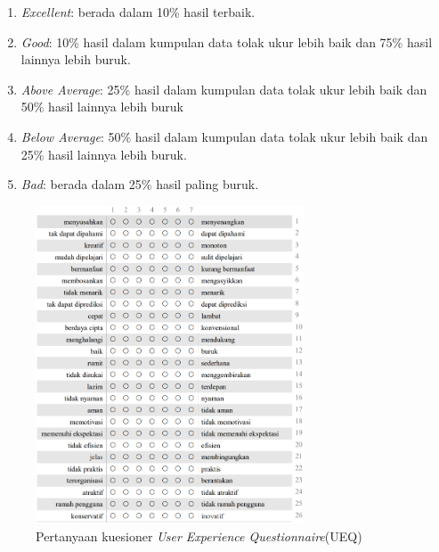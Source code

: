 \begin{enumerate}
	\item \textit{Excellent}: berada dalam 10\% hasil terbaik.
	\item \textit{Good}: 10\% hasil dalam kumpulan data tolak ukur lebih baik dan 75\% hasil lainnya lebih buruk. 
	\item \textit{Above Average}: 25\% hasil dalam kumpulan data tolak ukur lebih baik dan 50\% hasil lainnya lebih buruk 
	\item \textit{Below Average}: 50\% hasil dalam kumpulan data tolak ukur lebih baik dan 25\% hasil lainnya lebih buruk. 
	\item \textit{ Bad}: berada dalam 25\% hasil paling buruk. 
\end{enumerate}
\begin{figure}[H]
	\centering
	\includegraphics[width=8cm]{contents/chapter-2/images/UEQ-1.png}
	\caption{Pertanyaan kuesioner \textit{User Experience Questionnaire}(UEQ)}
	\label{Fig:UEQ}
\end{figure}


